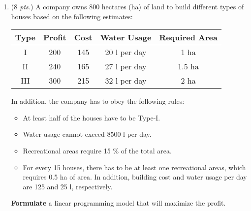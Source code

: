 \documentclass[a4paper,11pt]{article}
\begin{document}
\begin{enumerate}

\item (\textit{$8$ pts.}) A company owns 800 hectares (ha) of land to build different types of houses based on the following estimates:
    \begin{center}
        \begin{tabular}{|c|c|c|c|c|}
            \hline
            \textbf{Type} & \textbf{Profit} & \textbf{Cost} & \textbf{Water Usage}  & \textbf{Required Area} \\
            \hline
             I  & 200 & 145 & 20 l per day  & 1   ha \\ \hline
            II  & 240 & 165 & 27 l per day  & 1.5 ha \\  \hline
            III & 300 & 215 & 32 l per day  & 2   ha  \\ \hline
        \end{tabular}
    \end{center}
    In addition, the company has to obey the following rules:
    \begin{itemize}
        \item At least half of the houses have to be Type-I.
        \item Water usage cannot exceed 8500 l per day.
        \item Recreational areas require  15 \% of the total area.
        \item For every 15 houses, there has to be at least one recreational areas, which requires 0.5 ha of area.  In addition, building cost and water usage per day are 125 and 25 l, respectively.
    \end{itemize}
    \textbf{Formulate} a linear programming model that will maximize the profit.



\end{enumerate}
\end{document}
